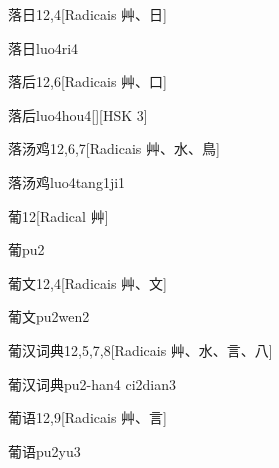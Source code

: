 \begin{entry}{落日}{12,4}[Radicais ⾋、⽇]
  \begin{phonetics}{落日}{luo4ri4}
  \end{phonetics}
\end{entry}

\begin{entry}{落后}{12,6}[Radicais ⾋、⼝]
  \begin{phonetics}{落后}{luo4hou4}[][HSK 3]
  \end{phonetics}
\end{entry}

\begin{entry}{落汤鸡}{12,6,7}[Radicais ⾋、⽔、⿃]
  \begin{phonetics}{落汤鸡}{luo4tang1ji1}
  \end{phonetics}
\end{entry}

\begin{entry}{葡}{12}[Radical ⾋]
  \begin{phonetics}{葡}{pu2}
  \end{phonetics}
\end{entry}

\begin{entry}{葡文}{12,4}[Radicais ⾋、⽂]
  \begin{phonetics}{葡文}{pu2wen2}
  \end{phonetics}
\end{entry}

\begin{entry}{葡汉词典}{12,5,7,8}[Radicais ⾋、⽔、⾔、⼋]
  \begin{phonetics}{葡汉词典}{pu2-han4 ci2dian3}
  \end{phonetics}
\end{entry}

\begin{entry}{葡语}{12,9}[Radicais ⾋、⾔]
  \begin{phonetics}{葡语}{pu2yu3}
  \end{phonetics}
\end{entry}

